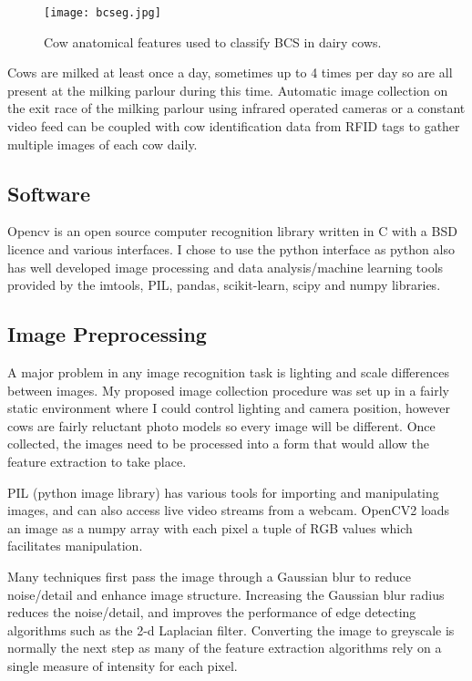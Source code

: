 \documentclass[11pt]{article}
\begin{document}
	\begin{figure}[h!]
		\centering
		\texttt{[image: bcseg.jpg]}
		\caption{Cow anatomical features used to classify BCS in dairy cows. \cite{Elanco}}
		\label{fig:<+label+>}
	\end{figure}

		Cows are milked at least once a day, sometimes up to 4 times per day so are all present at the milking parlour during this time.
		Automatic image collection on the exit race of the milking parlour using infrared operated cameras or a constant video feed can be coupled with cow identification data from RFID tags to gather multiple images of each cow daily.  

\subsection{Software}
	Opencv is an open source computer recognition library written in C with a BSD licence \cite{opencv_library} and various interfaces.
	I chose to use the python interface as python also has well developed image processing and data analysis/machine learning tools provided by the imtools, PIL, pandas, scikit-learn, scipy and numpy libraries.

	\newpage
\subsection{Image Preprocessing}
	A major problem in any image recognition task is lighting and scale differences between images.
	My proposed image collection procedure was set up in a fairly static environment where I could control lighting and camera position, however cows are fairly reluctant photo models so every image will be different.
	Once collected, the images need to be processed into a form that would allow the feature extraction to take place.


	PIL (python image library) has various tools for importing and manipulating images, and can also access live video streams from a webcam.
	OpenCV2 loads an image as a numpy array with each pixel a tuple of RGB values which facilitates manipulation.


	Many techniques first pass the image through a Gaussian blur to reduce noise/detail and enhance image structure. 
	Increasing the Gaussian blur radius reduces the noise/detail, and improves the performance of edge detecting algorithms such as the 2-d Laplacian filter.
	Converting the image to greyscale is normally the next step as many of the feature extraction algorithms rely on a single measure of intensity for each pixel.
\end{document}
